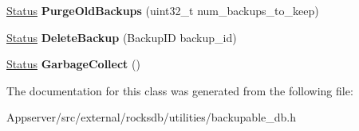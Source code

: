 \begin{DoxyCompactItemize}
\item 
\hyperlink{classrocksdb_1_1Status}{Status} {\bfseries Purge\+Old\+Backups} (uint32\+\_\+t num\+\_\+backups\+\_\+to\+\_\+keep)\hypertarget{classrocksdb_1_1RestoreBackupableDB_a8568545789fdcb4f707c61b711993d92}{}\label{classrocksdb_1_1RestoreBackupableDB_a8568545789fdcb4f707c61b711993d92}

\item 
\hyperlink{classrocksdb_1_1Status}{Status} {\bfseries Delete\+Backup} (Backup\+ID backup\+\_\+id)\hypertarget{classrocksdb_1_1RestoreBackupableDB_aeb3b0a390232dfbfb2676652b40ce7e5}{}\label{classrocksdb_1_1RestoreBackupableDB_aeb3b0a390232dfbfb2676652b40ce7e5}

\item 
\hyperlink{classrocksdb_1_1Status}{Status} {\bfseries Garbage\+Collect} ()\hypertarget{classrocksdb_1_1RestoreBackupableDB_a5a27018727fd65724bbf0d2c083ffea8}{}\label{classrocksdb_1_1RestoreBackupableDB_a5a27018727fd65724bbf0d2c083ffea8}

\end{DoxyCompactItemize}


The documentation for this class was generated from the following file\+:\begin{DoxyCompactItemize}
\item 
Appserver/src/external/rocksdb/utilities/backupable\+\_\+db.\+h\end{DoxyCompactItemize}
